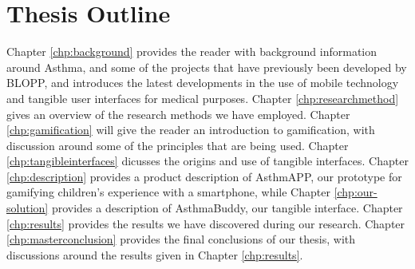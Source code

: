 \section{Thesis Outline}
Chapter \ref{chp:background} provides the reader with background information around Asthma, and some of the projects that have previously been developed by BLOPP, and introduces the latest developments in the use of mobile technology and tangible user interfaces for medical purposes.
Chapter \ref{chp:researchmethod} gives an overview of the research methods we have employed.  
Chapter \ref{chp:gamification} will give the reader an introduction to gamification, with discussion around some of the principles that are being used. 
Chapter \ref{chp:tangibleinterfaces} dicusses the origins and use of tangible interfaces.
Chapter \ref{chp:description} provides a product description of AsthmAPP, our prototype for gamifying children's experience with a smartphone, while Chapter \ref{chp:our-solution} provides a description of AsthmaBuddy, our tangible interface.
Chapter \ref{chp:results} provides the results we have discovered during our research.
Chapter \ref{chp:masterconclusion} provides the final conclusions of our thesis, with discussions around the results given in Chapter \ref{chp:results}.          
